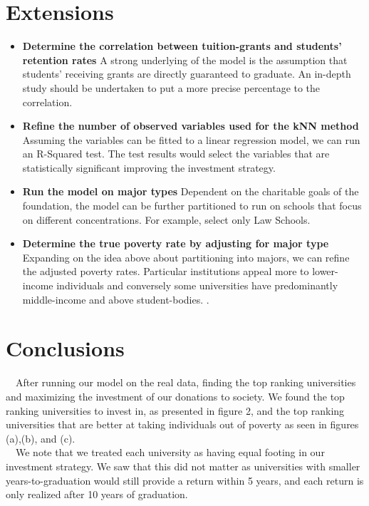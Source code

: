 \documentclass[12pt]{scrartcl}
\begin{document}
\section{Extensions}
	\begin{itemize}
		\item \textbf{Determine the correlation between tuition-grants and students' retention rates} A strong underlying of the model is the assumption that students' receiving grants are directly guaranteed to graduate. An in-depth study should be undertaken to put a more precise percentage to the correlation. 

		\item \textbf{Refine the number of observed variables used for the kNN method} Assuming the variables can be fitted to a linear regression model, we can run an R-Squared test. The test results would select the variables that are statistically significant improving the investment strategy. 

		\item \textbf{Run the model on major types} Dependent on the charitable goals of the foundation, the model can be further partitioned to run on schools that focus on different concentrations. For example, select only Law Schools. 

		\item \textbf{Determine the true poverty rate by adjusting for major type} Expanding on the idea above about partitioning into majors, we can refine the adjusted poverty rates. Particular institutions appeal more to lower-income individuals and conversely some universities have predominantly middle-income and above student-bodies. \cite{Carnevale}.
	\end{itemize}

\section{Conclusions}

	\ \ After running our model on the real data, finding the top ranking universities and maximizing the investment of our donations to society. We found the top ranking universities to invest in, as presented in figure 2, and the top ranking universities that are better at taking individuals out of poverty as seen in figures (a),(b), and (c).\\

	\ \ We note that we treated each university as having equal footing in our investment strategy. We saw that this did not matter	as universities with smaller years-to-graduation would still provide a return within 5 years, and each return is only realized after 10 years of graduation.\\
	
\end{document}
